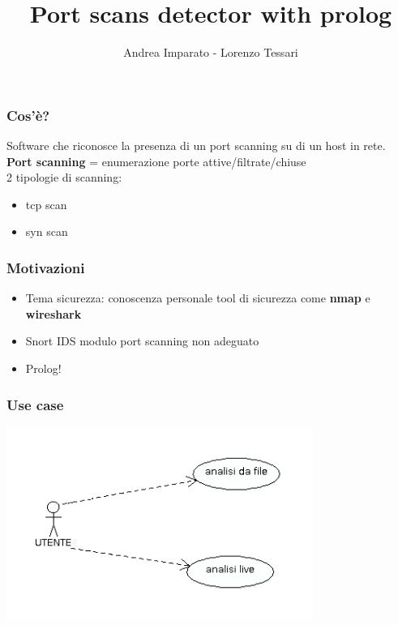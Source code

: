 \documentclass{beamer}
\title{Port scans detector with prolog}
\author{Andrea Imparato - Lorenzo Tessari}\institute{Unversit\`a degli studi di Padova}
\begin{document}
\begin{frame}
\titlepage
\end{frame}



\begin{frame}
\frametitle{Cos'\`e?}
Software che riconosce la presenza 
di un port scanning su di un host in rete.\\

\textbf{Port scanning} = enumerazione porte attive/filtrate/chiuse\\[2cm]

2 tipologie di scanning:

\begin{itemize}

\item tcp scan

\item syn scan


\end{itemize}




\end{frame}



\begin{frame}
\frametitle{Motivazioni}
\begin{itemize}[<+->]
\item Tema sicurezza: conoscenza personale tool di sicurezza come \textbf{nmap} e \textbf{wireshark}
\item Snort IDS modulo port scanning non adeguato
\item Prolog!
\end{itemize}
\end{frame}


\begin{frame}
\frametitle{Use case}
 \includegraphics[width=10cm]{usecase1.png}
\end{frame}
\end{document}
